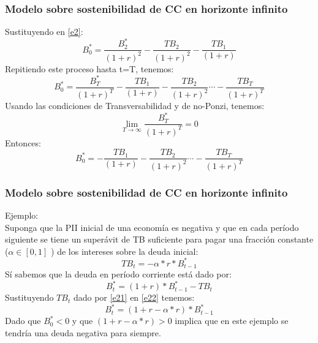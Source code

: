 \documentclass[10pt, xcolor=table, x11names]{beamer}
\begin{document}
	\begin{frame}
		\frametitle{{\normalsize Modelo sobre sostenibilidad de CC en horizonte infinito} {}}
		Sustituyendo en \ref{e2}:
		\begin{equation}
		B_{0}^{*}=\frac{B_{2}^{*}}{(1+r)^{2}}-\frac{TB_{2}}{(1+r)^{2}}-\frac{TB_{1}}{(1+r)}
		\label{e4}
		\end{equation}
		Repitiendo este proceso hasta t=T, tenemos:
		\begin{equation}
		B_{0}^{*}=\frac{B_{T}^{*}}{(1+r)^{T}}-\frac{TB_{1}}{(1+r)}-\frac{TB_{2}}{(1+r)^{2}}\cdots-\frac{TB_{T}}{(1+r)^{T}}
		\label{e5}
		\end{equation}
		Usando las condiciones de Transversabilidad y de no-Ponzi, tenemos:
		\begin{equation}
		\lim_{T\longrightarrow \infty} \frac{B_{T}^{*}}{(1+r)^{T}}=0
		\label{e6}
		\end{equation}
		Entonces:
		\begin{equation}
		B_{0}^{*}=-\frac{TB_{1}}{(1+r)}-\frac{TB_{2}}{(1+r)^{2}}\cdots-\frac{TB_{T}}{(1+r)^{T}}
		\label{e7}
		\end{equation}
	\end{frame}	
	
		\begin{frame}
			\frametitle{{\normalsize Modelo sobre sostenibilidad de CC en horizonte infinito} {}}
			Ejemplo:\\
			Suponga que la PII inicial de una economía es negativa y que en cada período siguiente se tiene un  superávit de TB suficiente para pagar una fracción constante ($\alpha \in [0,1]$ ) de los intereses sobre la deuda inicial:
			\setcounter{equation}{0}
			 \begin{equation}
			 TB_{t}=-\alpha*r*B_{t-1}^{*}
			 \label{e21}
			 \end{equation}	
			Sí sabemos que la deuda en período corriente está dado por:
			 \begin{equation}
			 B_{t}^{*}=(1+r)*B_{t-1}^{*}-TB_{t}
			 \label{e22}
			 \end{equation}	
			 Sustituyendo $TB_{t}$ dado por \ref{e21} en \ref{e22} tenemos:
			 \begin{equation}
			 B_{t}^{*}=(1+r-\alpha*r)*B_{t-1}^{*}
			 \label{e23}
			 \end{equation}	
			 Dado que $B_{0}^{*}<0$ y que $(1+r-\alpha*r)>0 $ implica que en este ejemplo se tendría una deuda negativa para siempre. 
		\end{frame}	
		
\end{document}
